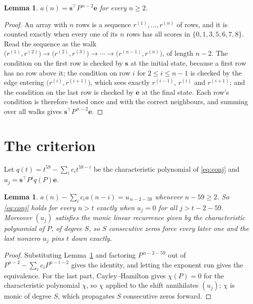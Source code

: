 \documentclass[11pt,a4paper]{article}
\theoremstyle{plain}
\newtheorem{lemma}[theorem]{Lemma}
\theoremstyle{definition}
\begin{document}
\begin{lemma}\label{lem:walk}
$a(n)=\mathbf{s}^{\!\top}P^{\,n-2}\mathbf{e}$ for every $n\ge2$.
\end{lemma}

\begin{proof}
An array with $n$ rows is a sequence $r^{(1)},\dots,r^{(n)}$ of rows, and it is counted
exactly when every one of its $n$ rows has all scores in $\{0,1,3,5,6,7,8\}$. Read the sequence as the
walk $\bigl(r^{(1)},r^{(2)}\bigr)\to\bigl(r^{(2)},r^{(3)}\bigr)\to\cdots\to
\bigl(r^{(n-1)},r^{(n)}\bigr)$, of length $n-2$. The condition on the first row is
checked by $\mathbf{s}$ at the initial state, because a first row has no row above it; the
condition on row $i$ for $2\le i\le n-1$ is checked by the edge entering
$\bigl(r^{(i)},r^{(i+1)}\bigr)$, which sees exactly $r^{(i-1)}$, $r^{(i)}$ and
$r^{(i+1)}$; and the condition on the last row is checked by $\mathbf{e}$ at the final
state. Each row's condition is therefore tested once and with the correct neighbours, and
summing over all walks gives $\mathbf{s}^{\!\top}P^{\,n-2}\mathbf{e}$.
\end{proof}

\section{The criterion}

Let $q(t)=t^{59}-\sum_i c_i t^{59-i}$ be the characteristic polynomial of
\eqref{eq:conj} and $u_j=\mathbf{s}^{\!\top}P^{j}q(P)\mathbf{e}$.

\begin{lemma}\label{lem:crit}
$a(n)-\sum_i c_i a(n-i)=u_{\,n-2-59}$ whenever $n-59\ge2$. So \eqref{eq:conj}
holds for every $n>t$ exactly when $u_j=0$ for all $j>t-2-59$. Moreover $(u_j)$
satisfies the monic linear recurrence given by the characteristic polynomial of $P$, of
degree $S$, so $S$ consecutive zeros force every later one and the last nonzero $u_j$ pins
$t$ down exactly.
\end{lemma}

\begin{proof}
Substituting Lemma~\ref{lem:walk} and factoring $P^{\,n-2-59}$ out of
$P^{n-2}-\sum_i c_i P^{n-i-2}$ gives the identity, and letting the exponent run gives the
equivalence. For the last part, Cayley--Hamilton gives $\chi(P)=0$ for the characteristic
polynomial $\chi$, so $\chi$ applied to the shift annihilates $(u_j)$; $\chi$ is monic of
degree $S$, which propagates $S$ consecutive zeros forward.
\end{proof}
\end{document}
